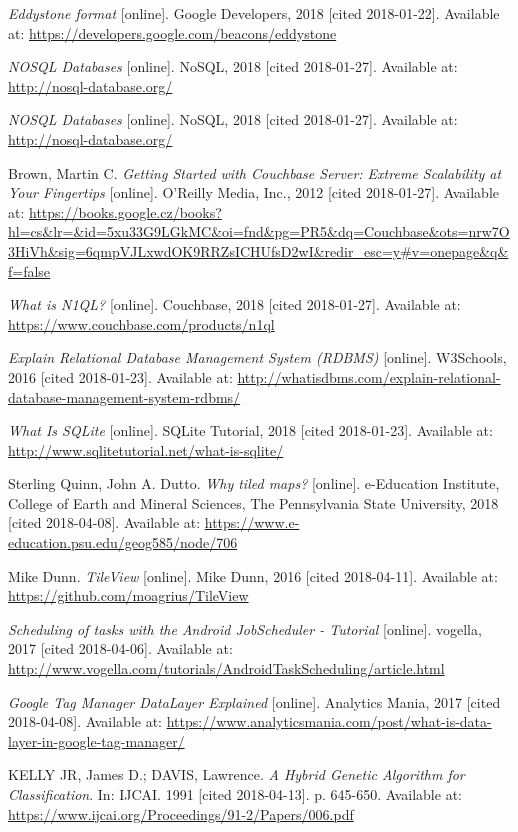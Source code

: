 \begin{thebibliography}{10}
\textit{Eddystone format} [online]. Google Developers, 2018 [cited 2018-01-22]. Available at: \url{https://developers.google.com/beacons/eddystone}

\textit{NOSQL Databases} [online]. NoSQL, 2018 [cited 2018-01-27]. Available at: \url{http://nosql-database.org/}

\textit{NOSQL Databases} [online]. NoSQL, 2018 [cited 2018-01-27]. Available at: \url{http://nosql-database.org/}

Brown, Martin C. \textit{Getting Started with Couchbase Server: Extreme Scalability at Your Fingertips} [online]. O'Reilly Media, Inc., 2012 [cited 2018-01-27]. Available at: \url{https://books.google.cz/books?hl=cs&lr=&id=5xu33G9LGkMC&oi=fnd&pg=PR5&dq=Couchbase&ots=nrw7O3HiVh&sig=6qmpVJLxwdOK9RRZsICHUfsD2wI&redir_esc=y#v=onepage&q&f=false}

\textit{What is N1QL?} [online]. Couchbase, 2018 [cited 2018-01-27]. Available at: \url{https://www.couchbase.com/products/n1ql}

\textit{Explain Relational Database Management System (RDBMS)} [online]. W3Schools, 2016 [cited 2018-01-23]. Available at: \url{http://whatisdbms.com/explain-relational-database-management-system-rdbms/}

\textit{What Is SQLite} [online]. SQLite Tutorial, 2018 [cited 2018-01-23]. Available at: \url{http://www.sqlitetutorial.net/what-is-sqlite/}

Sterling Quinn, John A. Dutto. \textit{Why tiled maps?} [online]. e-Education Institute, College of Earth and Mineral Sciences, The Pennsylvania State University, 2018 [cited 2018-04-08]. Available at: \url{https://www.e-education.psu.edu/geog585/node/706}

Mike Dunn. \textit{TileView} [online]. Mike Dunn, 2016 [cited 2018-04-11]. Available at: \url{https://github.com/moagrius/TileView}

\textit{Scheduling of tasks with the Android JobScheduler - Tutorial} [online]. vogella, 2017 [cited 2018-04-06]. Available at: \url{http://www.vogella.com/tutorials/AndroidTaskScheduling/article.html}

\textit{Google Tag Manager DataLayer Explained} [online]. Analytics Mania, 2017 [cited 2018-04-08]. Available at: \url{https://www.analyticsmania.com/post/what-is-data-layer-in-google-tag-manager/}

KELLY JR, James D.; DAVIS, Lawrence. \textit{A Hybrid Genetic Algorithm for Classification}. In: IJCAI. 1991 [cited 2018-04-13]. p. 645-650. Available at: \url{https://www.ijcai.org/Proceedings/91-2/Papers/006.pdf}

  

\end{thebibliography}